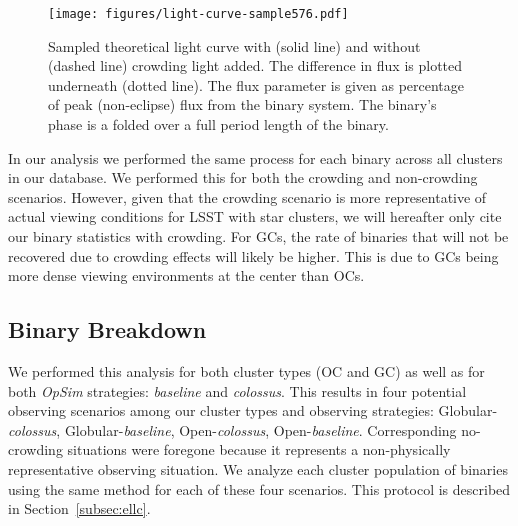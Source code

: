 \documentclass[twocolumn]{aastex63}
\begin{document}
\begin{figure}
    \centering
    \texttt{[image: figures/light-curve-sample576.pdf]}
    \caption{Sampled theoretical light curve with (solid line) and without (dashed line) crowding light added. The difference in flux is plotted underneath (dotted line). The flux parameter is given as percentage of peak (non-eclipse) flux from the binary system. The binary's phase is a folded over a full period length of the binary.}
    \label{fig:light3curve}
\end{figure}

In our analysis we performed the same process for each binary across all clusters in our database. We performed this for both the crowding and non-crowding scenarios. However, given that the crowding scenario is more representative of actual viewing conditions for LSST with star clusters, we will hereafter only cite our binary statistics with crowding. For GCs, the rate of binaries that will not be recovered due to crowding effects will likely be higher. This is due to GCs being more dense viewing environments at the center than OCs.



\subsection{Binary Breakdown}
\label{subsec: BinaryBreakdown}
We performed this analysis for both cluster types (OC and GC) as well as for both \textit{OpSim} strategies: \textit{baseline} and \textit{colossus}. %
This results in four potential observing scenarios among our cluster types and observing strategies: Globular-\textit{colossus}, Globular-\textit{baseline}, Open-\textit{colossus}, Open-\textit{baseline}. Corresponding no-crowding situations were foregone because it represents a non-physically representative observing situation. We analyze each cluster population of binaries using the same method for each of these four scenarios. This protocol is described in Section~\ref{subsec:ellc}.
\end{document}
